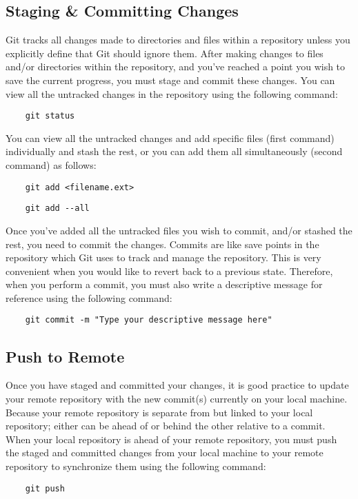 \documentclass{article}
\begin{document}
\subsection*{Staging \& Committing Changes}
Git tracks all changes made to directories and files within a repository unless you explicitly define that Git should ignore them. After making changes to files and/or directories within the repository, and you've reached a point you wish to save the current progress, you must stage and commit these changes. You can view all the untracked changes in the repository using the following command:
\begin{verbatim}
    git status
\end{verbatim}
You can view all the untracked changes and add specific files (first command) individually and stash the rest, or you can add them all simultaneously (second command) as follows:
\begin{verbatim}
    git add <filename.ext>
\end{verbatim}
\begin{verbatim}
    git add --all
\end{verbatim}
Once you've added all the untracked files you wish to commit, and/or stashed the rest, you need to commit the changes. Commits are like save points in the repository which Git uses to track and manage the repository. This is very convenient when you would like to revert back to a previous state. Therefore, when you perform a commit, you must also write a descriptive message for reference using the following command:
\begin{verbatim}
    git commit -m "Type your descriptive message here"
\end{verbatim}

\subsection*{Push to Remote}
Once you have staged and committed your changes, it is good practice to update your remote repository with the new commit(s) currently on your local machine. Because your remote repository is separate from but linked to your local repository; either can be ahead of or behind the other relative to a commit. When your local repository is ahead of your remote repository, you must push the staged and committed changes from your local machine to your remote repository to synchronize them using the following command:
\begin{verbatim}
    git push
\end{verbatim}
\end{document}
